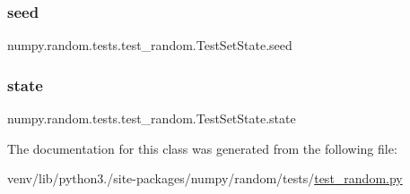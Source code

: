 \subsubsection{\texorpdfstring{seed}{seed}}
{\footnotesize\ttfamily numpy.\+random.\+tests.\+test\+\_\+random.\+Test\+Set\+State.\+seed}

\mbox{\label{classnumpy_1_1random_1_1tests_1_1test__random_1_1TestSetState_ae7764b3a60d59e09119df0ae97dc7c57}} 
\subsubsection{\texorpdfstring{state}{state}}
{\footnotesize\ttfamily numpy.\+random.\+tests.\+test\+\_\+random.\+Test\+Set\+State.\+state}



The documentation for this class was generated from the following file\+:\begin{DoxyCompactItemize}
\item 
venv/lib/python3./site-\/packages/numpy/random/tests/\hyperlink{test__random_8py}{test\+\_\+random.\+py}\end{DoxyCompactItemize}
